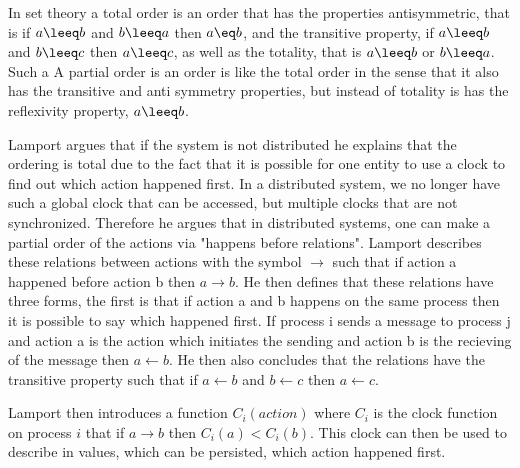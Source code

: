 		\newpar In set theory a total order is an order that has the properties antisymmetric, that is if $a \leeq b$ and $b \leeq a$ then $a \eq b$, and the transitive property, if $a \leeq b$ and $b \leeq c$ then $a \leeq c$, as well as the totality, that is $a \leeq b$ or $b \leeq a$. Such a  A partial order is an order is like the total order in the sense that it also has the transitive and anti symmetry properties, but instead of totality is has the reflexivity property, $a \leeq b$. 
		
		\newpar Lamport argues that if the system is not distributed he explains that the ordering is total due to the fact that it is possible for one entity to use a clock to find out which action happened first. In a distributed system, we no longer have such a global clock that can be accessed, but multiple clocks that are not synchronized. Therefore he argues that in distributed systems, one can make a partial order of the actions via "happens before relations". Lamport describes these relations between actions with the symbol $\rightarrow$ such that if action a happened before action b then $a \rightarrow b$. He then defines that these relations have three forms, the first is that if action a and b happens on the same process then it is possible to say which happened first. If process i sends a message to process j and action a is the action which initiates the sending and action b is the recieving of the message then $a \leftarrow b$. He then also concludes that the relations have the transitive property such that if $a \leftarrow b$ and $b \leftarrow c$ then $a \leftarrow c$. 
		
		\newpar Lamport then introduces a function $C_i(action)$ where $C_i$ is the clock function on process $i$ that if $a \rightarrow b$ then $C_i(a) < C_i(b)$. This clock can then be used to describe in values, which can be persisted, which action happened first.
		